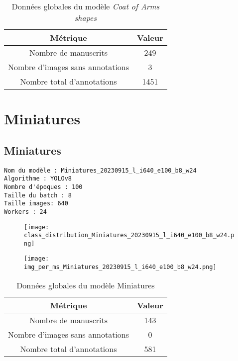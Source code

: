 \documentclass[12pt,twoside]{book}
\begin{document}
\begin{center}
\begin{table}[ht]
    \centering
    \caption{Données globales du modèle \textit{Coat of Arms shapes}}
    \begin{tabular}{|c|c|}
    \hline
    \textbf{Métrique} & \textbf{Valeur} \\
    \hline
    Nombre de manuscrits & 249 \\ 
    \hline
    Nombre d'images sans annotations & 3 \\ 
    \hline
    Nombre total d'annotations & 1451 \\ 
    \hline
    \end{tabular}
\end{table}    
\end{center}

\newpage
\section{Miniatures}
\subsection{Miniatures}

\begin{verbatim}
Nom du modèle : Miniatures_20230915_l_i640_e100_b8_w24
Algorithme : YOLOv8
Nombre d'époques : 100
Taille du batch : 8
Taille images: 640
Workers : 24
\end{verbatim}


\begin{figure}[ht]
    \centering
    \begin{minipage}[b]{0.45\textwidth}
        \centering
        \texttt{[image: class\_distribution\_Miniatures\_20230915\_l\_i640\_e100\_b8\_w24.png]}
    \end{minipage}
    \hfill
    \begin{minipage}[b]{0.45\textwidth}
        \centering
        \texttt{[image: img\_per\_ms\_Miniatures\_20230915\_l\_i640\_e100\_b8\_w24.png]}
    \end{minipage}
\end{figure}

\begin{center}
\begin{table}[ht]
    \centering
    \caption{Données globales du modèle Miniatures}
    \begin{tabular}{|c|c|}
    \hline
    \textbf{Métrique} & \textbf{Valeur} \\
    \hline
    Nombre de manuscrits & 143 \\ 
    \hline
    Nombre d'images sans annotations & 0 \\ 
    \hline
    Nombre total d'annotations & 581 \\ 
    \hline
    \end{tabular}
\end{table}    
\end{center}
\end{document}
